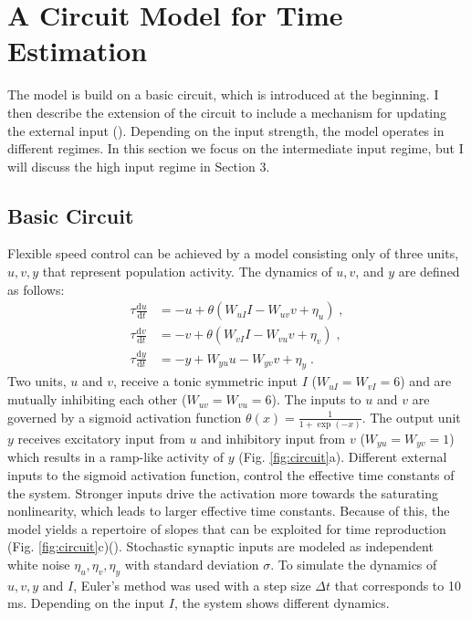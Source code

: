 \documentclass[10pt]{article}
\begin{document}
\section{A Circuit Model for Time Estimation}
The model is build on a basic circuit, which is introduced at the beginning. I then describe the extension of the circuit to include a mechanism for updating the external input (\cite{Egger2020}).
Depending on the input strength, the model operates in different regimes. 
In this section we focus on the intermediate input regime, but I will discuss the high input regime in Section 3.

\subsection{Basic Circuit}
Flexible speed control can be achieved by a model consisting only of three units, $u, v, y$ that represent population activity.
The dynamics of $u, v$, and $y$ are defined as follows:
\begin{equation} \label{circuit}
	\begin{split}
	\tau\frac{\text{d}u}{\text{d}t} & = -u + \theta(W_{uI}I - W_{uv}v + \eta_u) \;, \\
	\tau\frac{\text{d}v}{\text{d}t} & = -v + \theta(W_{vI}I - W_{vu}v + \eta_v) \;, \\
	\tau\frac{\text{d}y}{\text{d}t} & = -y + W_{yu}u - W_{yv}v + \eta_y \;.
	\end{split}
\end{equation}
Two units, $u$ and $v$, receive a tonic symmetric input $I$ ($W_{uI}=W_{vI}=6$) and are mutually inhibiting each other ($W_{uv}=W_{vu}=6$). 
The inputs to $u$ and $v$ are governed by a sigmoid activation function $\theta(x) = \frac{1}{1+\exp(-x)}$.
The output unit $y$ receives excitatory input from $u$ and inhibitory input from $v$ ($W_{yu}=W_{yv}=1$) which results in a ramp-like activity of $y$ (Fig. \ref{fig:circuit}a).
Different external inputs to the sigmoid activation function, control the effective time constants of the system. Stronger inputs drive the activation more towards the saturating nonlinearity, which leads to larger effective time constants.
Because of this, the model yields a repertoire of slopes that can be exploited for time reproduction (Fig. \ref{fig:circuit}c)(\cite{Egger2020}). 
Stochastic synaptic inputs are modeled as independent white noise $\eta_u, \eta_v, \eta_y$ with standard deviation $\sigma$.
To simulate the dynamics of $u, v, y$ and $I$, Euler's method was used with a step size $\Delta t$ that corresponds to 10 ms.
Depending on the input $I$, the system shows different dynamics.
\end{document}
